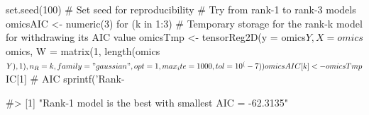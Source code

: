 \begin{Schunk}
\begin{Sinput}
set.seed(100) # Set seed for reproducibility
# Try from rank-1 to rank-3 models
omicsAIC <- numeric(3)
for (k in 1:3) {
  # Temporary storage for the rank-k model for withdrawing its AIC value
  omicsTmp <- tensorReg2D(y = omics$Y, X = omics$omics, 
                          W = matrix(1, length(omics$Y), 1),
                          n_R = k, family = "gaussian", 
                          opt = 1, max_ite = 1000, tol = 10^(-7) )
  omicsAIC[k] <- omicsTmp$IC[1] # AIC
}
sprintf('Rank-%
\end{Sinput}
\begin{Soutput}
#> [1] "Rank-1 model is the best with smallest AIC = -62.3135"
\end{Soutput}
\end{Schunk}
